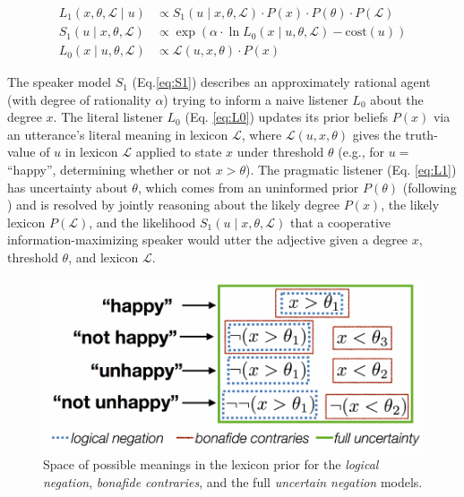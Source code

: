 \documentclass[floatsintext,doc]{apa6}
\begin{document}
\vspace*{-0.5cm}

\begin{align}
L_{1}(x, \theta, \mathcal{L} \mid u) &\propto S_{1}(u \mid x, \theta, \mathcal{L}) \cdot P(x) \cdot  P(\theta) \cdot P(\mathcal{L}) \label{eq:L1} \\
S_{1}(u \mid x, \theta, \mathcal{L}) &\propto \exp{(\alpha \cdot \ln {L_{0}(x \mid u, \theta, \mathcal{L})} - \text{cost}(u))} \label{eq:S1}\\
L_{0}(x \mid u, \theta, \mathcal{L}) &\propto \mathcal{L}(u, x, \theta) \cdot P(x) \label{eq:L0}
\end{align}

The speaker model \(S_1\) (Eq.\ref{eq:S1}) describes an approximately rational agent (with degree of rationality \(\alpha\)) trying to inform a naive listener \(L_0\) about the degree \(x\).
The literal listener \(L_0\) (Eq. \ref{eq:L0}) updates its prior beliefs \(P(x)\) via an utterance's literal meaning in lexicon \(\mathcal{L}\),
where \(\mathcal{L}(u, x, \theta)\) gives the truth-value of \(u\) in lexicon \(\mathcal{L}\) applied to state \(x\) under threshold \(\theta\) (e.g., for $u= $\enquote{happy}, determining whether or not \(x>\theta\)).
The pragmatic listener (Eq. \ref{eq:L1}) has uncertainty about \(\theta\), which comes from an uninformed prior \(P(\theta)\) (following ) and is resolved by jointly reasoning about the likely degree \(P(x)\), the likely lexicon \(P(\mathcal{L})\), and the likelihood \(S_1(u \mid x, \theta, \mathcal{L})\) that a cooperative information-maximizing speaker would utter the adjective given a degree \(x\), threshold \(\theta\), and lexicon \(\mathcal{L}\).

\begin{figure}
\centering
\includegraphics{figs/lexicon-model-1.pdf}
\caption{\label{fig:lexicon-model}Space of possible meanings in the lexicon prior for the \emph{logical negation}, \emph{bonafide contraries}, and the full \emph{uncertain negation} models.}
\end{figure}
\end{document}
